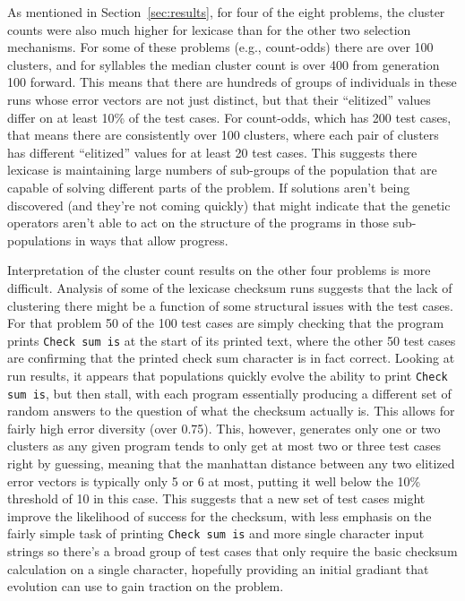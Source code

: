 As mentioned in Section~\ref{sec:results}, for four of the eight problems, the cluster counts were
also much higher for lexicase than for the other two selection mechanisms. For some of these problems
(e.g., count-odds) there are over 100 clusters, and for syllables the median cluster count is over 400
from generation 100 forward. This means that there are hundreds of groups of individuals in these runs
whose error vectors are not just distinct, but that their ``elitized'' values differ on at least 10\%
of the test cases. For count-odds, which has 200 test cases, that means there are consistently over
100 clusters, where each pair of clusters has different ``elitized'' values for at least 20 test cases.
This suggests there lexicase is maintaining large numbers of sub-groups of the population that are 
capable of solving different parts of the problem. If solutions aren't being discovered (and they're
not coming quickly) that might indicate that the genetic operators aren't able to act on the structure 
of the programs in those sub-populations in ways that allow progress.

Interpretation of the cluster count results on the other four problems is more difficult. Analysis
of some of the lexicase checksum runs suggests that the lack of clustering there might be a function
of some structural issues with the test cases. For that problem 50 of the 100 test cases are simply
checking that the program prints \texttt{Check sum is} at the start of its printed text, where the other
50 test cases are confirming that the printed check sum character is in fact correct. Looking at run
results, it appears that populations quickly evolve the ability to print \texttt{Check sum is}, but
then stall, with each program essentially producing a different set of random answers to the question
of what the checksum actually is. This allows for fairly high error diversity (over 0.75). This, however,
generates only one or two clusters as any given program tends to only get at most two or three test 
cases right by guessing, meaning that the manhattan distance between any two elitized error vectors
is typically only 5 or 6 at most, putting it well below the 10\% threshold of 10 in this case. This
suggests that a new set of test cases might improve the likelihood of success for the checksum, with
less emphasis on the fairly simple task of printing \texttt{Check sum is} and more single character
input strings so there's a broad group of test cases that only require the basic checksum calculation
on a single character, hopefully providing an initial gradiant that evolution can use to gain
traction on the problem.

